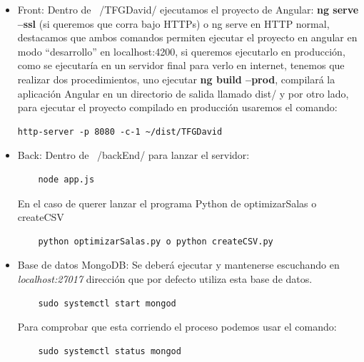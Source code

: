 \documentclass[a4paper, 12pt]{book}
\begin{document}
\begin{itemize}
  \item Front: Dentro de ~/TFGDavid/ ejecutamos el proyecto de Angular:
	\textbf{ng serve --ssl} (si queremos que corra bajo HTTPs) o ng serve en HTTP normal, destacamos que ambos comandos permiten ejecutar el proyecto en angular en modo ``desarrollo'' en localhost:4200, si queremos ejecutarlo en producción, como se ejecutaría en un servidor final para verlo en internet, tenemos que realizar dos procedimientos, uno ejecutar \textbf{ng build --prod}, compilará la aplicación Angular en un directorio de salida llamado dist/ y por otro lado, para ejecutar el proyecto compilado en producción usaremos el comando:
\begin{verbatim}
http-server -p 8080 -c-1 ~/dist/TFGDavid
\end{verbatim}

	
\item Back: Dentro de ~/backEnd/ para lanzar el servidor: 

	\begin{verbatim}
	node app.js
	\end{verbatim}

En el caso de querer lanzar el programa Python de optimizarSalas o createCSV
	\begin{verbatim}
	python optimizarSalas.py o python createCSV.py
	\end{verbatim}
	
\item Base de datos MongoDB: Se deberá ejecutar y mantenerse escuchando en \textit{localhost:27017} dirección que por defecto utiliza esta base de datos.

	\begin{verbatim}
	sudo systemctl start mongod
	\end{verbatim}

Para comprobar que esta corriendo el proceso podemos usar el comando:

	\begin{verbatim}
	sudo systemctl status mongod
	\end{verbatim}

\end{itemize}

\cleardoublepage

\nocite{*}

  

\end{document}
